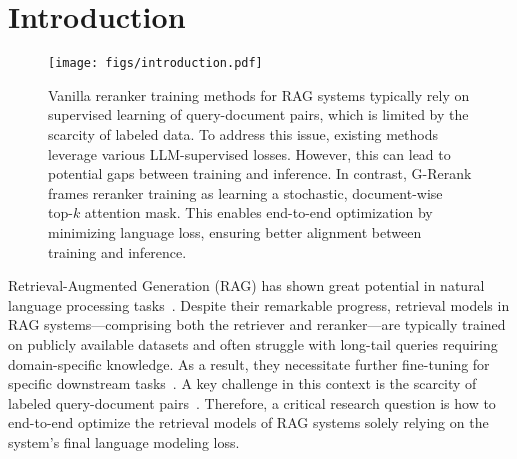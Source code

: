 \section{Introduction}

\begin{figure*}[t]
\centering
  \texttt{[image: figs/introduction.pdf]}
\caption{Vanilla reranker training methods for RAG systems typically rely on supervised learning of query-document pairs, which is limited by the scarcity of labeled data. To address this issue, existing methods leverage various LLM-supervised losses. However, this can lead to potential gaps between training and inference. In contrast, G-Rerank frames reranker training as learning a stochastic, document-wise top-\(k\) attention mask. This enables end-to-end optimization by minimizing language loss, ensuring better alignment between training and inference.}
  \label{fig:introduction}
\end{figure*}

Retrieval-Augmented Generation (RAG) has shown great potential in natural language processing tasks~\cite{DBLP:conf/nips/LewisPPPKGKLYR020, DBLP:conf/icml/GuuLTPC20, DBLP:conf/eacl/IzacardG21, DBLP:conf/icml/BorgeaudMHCRM0L22}. Despite their remarkable progress, retrieval models in RAG systems—comprising both the retriever and reranker—are typically trained on publicly available datasets and often struggle with long-tail queries requiring domain-specific knowledge.  As a result, they necessitate further fine-tuning for specific downstream tasks~\cite{DBLP:conf/naacl/GlassRCNCG22, DBLP:conf/naacl/ShiMYS0LZY24}. A key challenge in this context is the scarcity of labeled query-document pairs~\cite{DBLP:conf/acl/LeeCT19, DBLP:journals/tacl/SachanLYZPZ23}. Therefore, a critical research question is how to end-to-end optimize the retrieval models of RAG systems solely relying on the system’s final language modeling loss.

